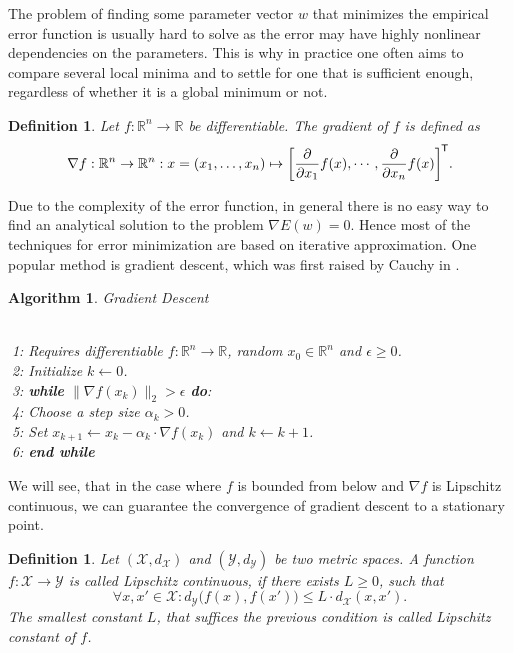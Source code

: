\documentclass[11pt, a4paper]{article}
\newtheorem{definition}[theorem]{Definition}
\newtheorem{algorithm}[theorem]{Algorithm}
\newcommand{\R}{\mathbb{R}}
\newcommand{\X}{\mathcal{X}}
\newcommand{\Y}{\mathcal{Y}}
\newcommand*{\tr}{^{\mkern-1.5mu\mathsf{T}}}
\begin{document}
The problem of finding some parameter vector $w$ that minimizes the empirical error function is usually hard to solve as the error may have highly nonlinear dependencies on the parameters. This is why in practice one often aims to compare several local minima and to settle for one that is sufficient enough, regardless of whether it is a global minimum or not.

\begin{definition}
Let $f: \R^n \to \R$ be differentiable. The gradient of $f$ is defined as
\[ \nabla f : \R^n \to \R^n : x = (x_1, \dots, x_n) \mapsto \bigg [ \frac{\partial}{\partial x_1} f(x), \cdots, \frac{\partial}{\partial x_n} f(x) \bigg ]\tr . \]
\end{definition}

Due to the complexity of the error function, in general there is no easy way to find an analytical solution to the problem $\nabla E(w) = 0$. Hence most of the techniques for error minimization are based on iterative approximation. One popular method is gradient descent, which was first raised by Cauchy in \cite{GD}.

\begin{algorithm}
\caption{Gradient Descent} \ \\
\textcolor{white}{$\Big |$}1: Requires differentiable $f: \R^n \to \R$, random $x_0 \in \R^n$ and $\epsilon \geq 0$. \\
\textcolor{white}{$\Big |$}2: Initialize $k \leftarrow 0$. \\
\textcolor{white}{$\Big |$}3: \textbf{while} $ \big \| \nabla f(x_k) \big \|_2 > \epsilon $ \textbf{do}:\\
\textcolor{white}{$\Big |$}4: \quad Choose a step size $\alpha_k > 0$. \\
\textcolor{white}{$\Big |$}5: \quad Set $x_{k+1} \leftarrow x_k - \alpha_k \cdot \nabla f(x_k)$ and $k \leftarrow k+1$. \\
\textcolor{white}{$\Big |$}6: \textbf{end while}
\end {algorithm}

We will see, that in the case where $f$ is bounded from below and $\nabla f$ is Lipschitz continuous, we can guarantee the  convergence of gradient descent to a stationary point.

\begin{definition}
Let $(\X,d_{\X})$ and $(\Y, d_{\Y})$ be two metric spaces. A function $f: \X \to \Y$ is called Lipschitz continuous, if there exists $L \geq 0$, such that
\[ \forall x,x' \in \X : d_{\Y} \big ( f(x) , f(x') \big ) \leq L \cdot d_{\X}(x,x'). \]
The smallest constant $L$, that suffices the previous condition is called Lipschitz constant of $f$.
\end{definition}
\end{document}
